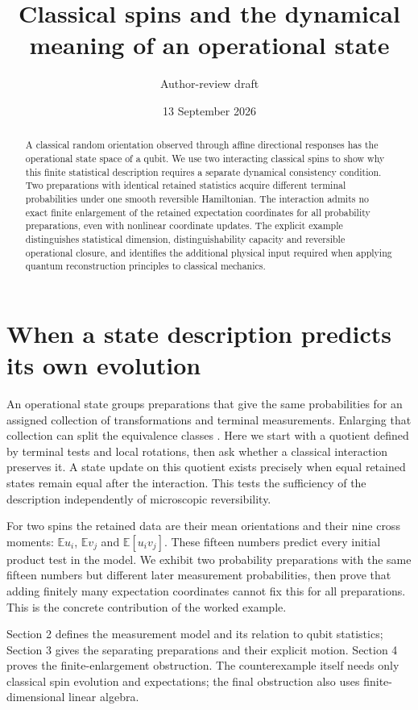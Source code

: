 \documentclass[11pt,a4paper]{article}
\title{Classical spins and the dynamical meaning of an operational state}
\author{Author-review draft}
\date{13 September 2026}
\newcommand{\E}{\mathbb E}
\begin{document}
\maketitle
\begin{abstract}
A classical random orientation observed through affine directional responses
has the operational state space of a qubit. We use two interacting classical
spins to show why this finite statistical description requires a separate
dynamical consistency condition. Two preparations with identical retained
statistics acquire different terminal probabilities under one smooth reversible
Hamiltonian. The interaction admits no exact finite enlargement of the retained
expectation coordinates for all probability preparations, even with nonlinear
coordinate updates. The explicit example distinguishes statistical dimension,
distinguishability capacity and reversible operational closure, and identifies
the additional physical input required when applying quantum reconstruction
principles to classical mechanics.
\end{abstract}

\section{When a state description predicts its own evolution}
An operational state groups preparations that give the same probabilities for
an assigned collection of transformations and terminal measurements. Enlarging
that collection can split the equivalence classes \cite{preparation}.
Here we start with a quotient defined by terminal tests and local rotations,
then ask whether a classical interaction preserves it. A state update on this
quotient exists precisely when equal retained states remain equal after the
interaction. This tests the sufficiency of the description independently of
microscopic reversibility.

For two spins the retained data are their mean orientations and their nine
cross moments: $\E u_i$, $\E v_j$ and $\E[u_i v_j]$. These fifteen numbers
predict every initial product test in the model. We exhibit two probability
preparations with the same fifteen numbers but different later measurement
probabilities, then prove that adding finitely many expectation coordinates
cannot fix this for all preparations. This is the concrete contribution of
the worked example.

Section 2 defines the measurement model and its relation to qubit statistics;
Section 3 gives the separating preparations and their explicit motion.
Section 4 proves the finite-enlargement obstruction. The counterexample itself
needs only classical spin evolution and expectations; the final obstruction
also uses finite-dimensional linear algebra.
\end{document}

